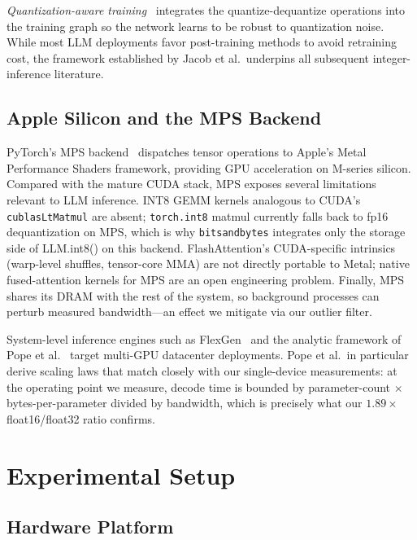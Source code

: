 \documentclass[conference]{IEEEtran}
\begin{document}
\textit{Quantization-aware training}~\cite{jacob2018} integrates the
quantize-dequantize operations into the training graph so the network
learns to be robust to quantization noise. While most LLM deployments
favor post-training methods to avoid retraining cost, the framework
established by Jacob et al.\ underpins all subsequent integer-inference
literature.

\subsection{Apple Silicon and the MPS Backend}

PyTorch's MPS backend~\cite{pytorch_mps} dispatches tensor operations
to Apple's Metal Performance Shaders framework, providing GPU
acceleration on M-series silicon. Compared with the mature CUDA stack,
MPS exposes several limitations relevant to LLM inference. INT8 GEMM
kernels analogous to CUDA's \texttt{cublasLtMatmul} are absent;
\texttt{torch.int8} matmul currently falls back to fp16 dequantization
on MPS, which is why \texttt{bitsandbytes} integrates only the storage
side of LLM.int8() on this backend. FlashAttention's CUDA-specific
intrinsics (warp-level shuffles, tensor-core MMA) are not directly
portable to Metal; native fused-attention kernels for MPS are an open
engineering problem. Finally, MPS shares its DRAM with the rest of the
system, so background processes can perturb measured bandwidth---an
effect we mitigate via our outlier filter.

System-level inference engines such as FlexGen~\cite{sheng2023} and the
analytic framework of Pope et al.~\cite{pope2023} target multi-GPU
datacenter deployments. Pope et al.\ in particular derive scaling laws
that match closely with our single-device measurements: at the operating
point we measure, decode time is bounded by parameter-count $\times$
bytes-per-parameter divided by bandwidth, which is precisely what our
$1.89\times$ float16/float32 ratio confirms.

\section{Experimental Setup}

\subsection{Hardware Platform}
\end{document}
